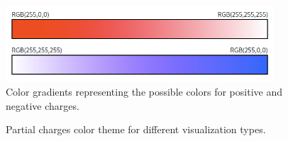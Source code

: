 \documentclass[
  digital,     %
  oneside,     %
  nosansbold,  %
  nocolorbold, %
  lof,         %
  lot,         %
]{fithesis4}
\begin{document}
\begin{figure}[htbp]
  \begin{center}
    \includegraphics[width=10cm]{figures/color_gradients.png}
  \end{center}
  \caption{Color gradients representing the possible colors for positive and negative charges.}
  \label{fig:color_gradients}
\end{figure}

\begin{figure}[htbp]
  \centering
  \caption{Partial charges color theme for different visualization types.}
  \label{fig:partial_charges_color_theme}
\end{figure}
\end{document}
